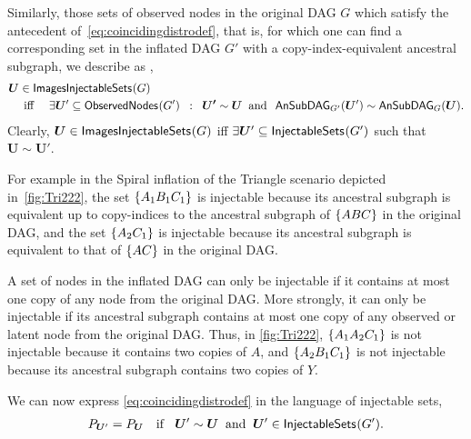 \documentclass[aps,english,superscriptaddress,onecolumn,twoside,longbibliography,pra,floatfix,fleqn,nofootinbib]{revtex4-1}%
\newcommand*{\tblue}[1]{{\color{MidnightBlue}{\textbf{#1}}}}
\theoremstyle{definition}
\newcommand{\SmallNamedFunction}[3][]{\operatorname{\mathsf{#2}}_{#1}\parenths{#3}}
\newcommand{\ansubgraph}[2][]{\SmallNamedFunction[#1]{AnSubDAG}{#2}}
\DeclarePairedDelimiter{\parenths}{\lparen}{\rparen}
\DeclarePairedDelimiter{\braces}{\lbrace}{\rbrace}
\newcommand{\brackets}[1]{\braces*{#1}}
\begin{document}
Similarly,  those sets of observed nodes in the original DAG $G$ which satisfy the antecedent of~\cref{eq:coincidingdistrodef}, that is, for which one can find a corresponding set in the inflated DAG $G'$ with a copy-index-equivalent ancestral subgraph, we describe as \tblue{images of the injectable sets},
\begin{align}\begin{split}\label{eq:defimageinjectable}
& \bm{U}\in\SmallNamedFunction{ImagesInjectableSets}{G} \\
& \quad\text{ iff }\quad \exists \bm{U}' \subseteq \SmallNamedFunction{ObservedNodes}{G'} \;\; :\;\; \bm{U'}\sim\bm{U} \;\;\text{and}\;\; \ansubgraph[G']{\bm{U}'}\sim\ansubgraph[G]{\bm{U}}.
\end{split}\end{align}
Clearly, $\bm{U}\in\SmallNamedFunction{ImagesInjectableSets}{G}$ iff $\exists \bm{U}' \subseteq \SmallNamedFunction{InjectableSets}{G'}$ such that $\bm{U}\sim \bm{U}'$.


For example in the Spiral inflation of the Triangle scenario depicted in~\cref{fig:Tri222}, the set $\brackets{A_1 B_1 C_1}$ is injectable because its ancestral subgraph is equivalent up to copy-indices to the ancestral subgraph of $\brackets{A B C}$ in the original DAG, and the set $\brackets{A_2 C_1}$ is injectable because its ancestral subgraph is equivalent to that of $\brackets{ A C}$ in the original DAG. 

A set of nodes in the inflated DAG can only be injectable if it contains at most one copy of any node from the original DAG. More strongly, it can only be injectable if its ancestral subgraph contains at most one copy of any observed or latent node from the original DAG.  
Thus, in \cref{fig:Tri222}, $\brackets{A_1 A_2 C_1}$ is not injectable because it contains two copies of $A$, and $\brackets{A_2 B_1 C_1}$ is not injectable because its ancestral subgraph contains two copies of $Y$. 

We can now express \cref{eq:coincidingdistrodef} in the language of injectable sets,
\begin{align}\label{keyinference}
P_{\bm{U}'}=P_{\bm{U}}\quad\text{if }  \;\; \bm{U}' \sim \bm{U}\;\; \text{and} \;\; \bm{U}'\in\SmallNamedFunction{InjectableSets}{G'}.%
\end{align}
\end{document}
